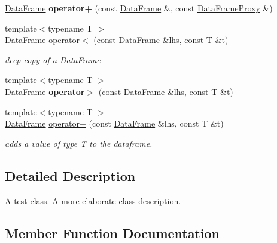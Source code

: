\begin{DoxyCompactItemize}
\item 
\mbox{\label{classDataFrame_a32fc0676af70bd35bf83e11c9ab946fc}} 
\hyperlink{classDataFrame}{Data\+Frame} {\bfseries operator+} (const \hyperlink{classDataFrame}{Data\+Frame} \&, const \hyperlink{classDataFrame_1_1DataFrameProxy}{Data\+Frame\+Proxy} \&)
\item 
{\footnotesize template$<$typename T $>$ }\\\hyperlink{classDataFrame}{Data\+Frame} \hyperlink{classDataFrame_a8c08b940f5d6a095ac079ef277133c1a}{operator$<$} (const \hyperlink{classDataFrame}{Data\+Frame} \&lhs, const T \&t)
\begin{DoxyCompactList}\small\item\em deep copy of a \hyperlink{classDataFrame}{Data\+Frame} \end{DoxyCompactList}\item 
\mbox{\label{classDataFrame_a2f57f70e3f2a2ad34bddef16fcc2cf82}} 
{\footnotesize template$<$typename T $>$ }\\\hyperlink{classDataFrame}{Data\+Frame} {\bfseries operator$>$} (const \hyperlink{classDataFrame}{Data\+Frame} \&lhs, const T \&t)
\item 
{\footnotesize template$<$typename T $>$ }\\\hyperlink{classDataFrame}{Data\+Frame} \hyperlink{classDataFrame_af0bd28935e605ba646d407b02e0a5850}{operator+} (const \hyperlink{classDataFrame}{Data\+Frame} \&lhs, const T \&t)
\begin{DoxyCompactList}\small\item\em adds a value of type T to the dataframe. \end{DoxyCompactList}\end{DoxyCompactItemize}


\subsection{Detailed Description}
A test class. A more elaborate class description. 

\subsection{Member Function Documentation}
\mbox{\label{classDataFrame_a857dadee258495743462244022a2dcce}} 
